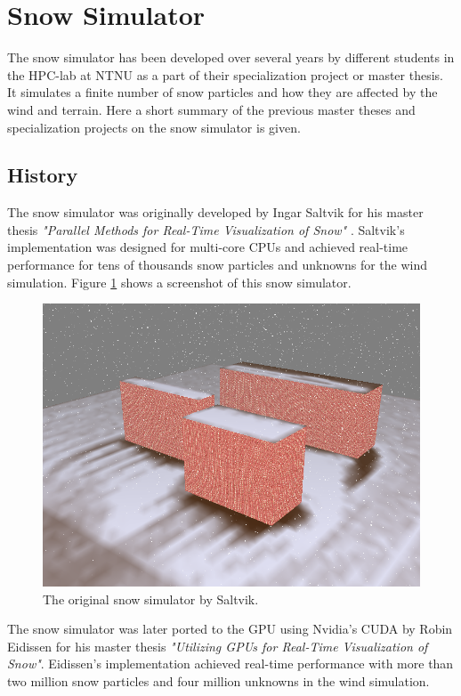 \section{Snow Simulator}

The snow simulator has been developed over several years by different students in 
the HPC-lab at NTNU as a part of their specialization project or master thesis. 
It simulates a finite number of snow particles and how they are affected by the 
wind and terrain. Here a short summary of the previous master theses and 
specialization projects on the snow simulator is given.

\subsection{History}

The snow simulator was originally developed by Ingar Saltvik for his master
thesis \emph{"Parallel Methods for Real-Time Visualization of Snow"}
\cite{originalSnowThesis}. Saltvik's implementation was designed for multi-core
CPUs and achieved real-time performance for tens of thousands snow particles
and unknowns for the wind simulation. Figure \ref{fig:originalSnow} shows a 
screenshot of this snow simulator.

\begin{figure}[ht]
	\center
	\includegraphics[width=1.0\textwidth]{images/snow/serial/snow5}
	\caption{The original snow simulator by Saltvik.}
	\label{fig:originalSnow}
\end{figure}

The snow simulator was later ported to the GPU using Nvidia's CUDA by Robin
Eidissen for his master thesis \emph{"Utilizing GPUs for Real-Time Visualization
of Snow"}\cite{gpuSnowThesis}. Eidissen's implementation achieved real-time
performance with more than two million snow particles and four million unknowns
in the wind simulation.

